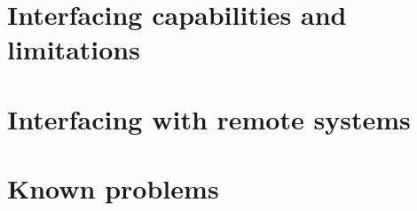 \documentclass[twoside,a4paper]{refart}
\begin{document}
\newpage
\section{Interfacing capabilities and limitations}


\newpage
\section{Interfacing with remote systems}


\newpage

\section{Known problems}


\newpage
\printindex

\end{document}
